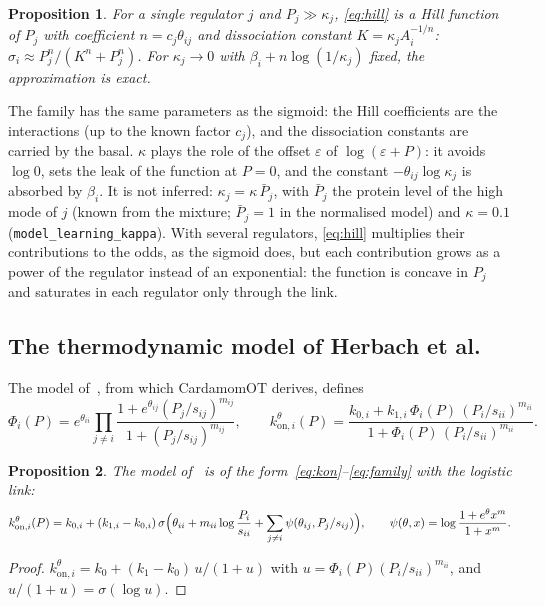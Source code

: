 \documentclass[a4paper, 11pt]{article}
\newcommand{\koni}{k_{\mathrm{on},i}^{\theta}}
\theoremstyle{plain}
\newtheorem{prop}{Proposition}
\theoremstyle{remark}
\begin{document}
\begin{prop}\label{prop:hill}
For a single regulator $j$ and $P_j \gg \kappa_j$, \eqref{eq:hill} is a Hill function of $P_j$ with coefficient $n = c_j\theta_{ij}$ and dissociation constant $K = \kappa_j A_i^{-1/n}$: $\sigma_i \approx P_j^n / (K^n + P_j^n)$. For $\kappa_j \to 0$ with $\beta_i + n\log(1/\kappa_j)$ fixed, the approximation is exact.
\end{prop}

The family has the same parameters as the sigmoid: the Hill coefficients are the interactions (up to the known factor $c_j$), and the dissociation constants are carried by the basal. $\kappa$ plays the role of the offset $\varepsilon$ of $\log(\varepsilon + P)$: it avoids $\log 0$, sets the leak of the function at $P = 0$, and the constant $-\theta_{ij}\log\kappa_j$ is absorbed by $\beta_i$. It is not inferred: $\kappa_j = \kappa\,\bar P_j$, with $\bar P_j$ the protein level of the high mode of $j$ (known from the mixture; $\bar P_j = 1$ in the normalised model) and $\kappa = 0.1$ (\texttt{model\_learning\_kappa}). With several regulators, \eqref{eq:hill} multiplies their contributions to the odds, as the sigmoid does, but each contribution grows as a power of the regulator instead of an exponential: the function is concave in $P_j$ and saturates in each regulator only through the link.

\subsection{The thermodynamic model of Herbach et al.}\label{sec:herbach}

The model of~\cite{herbachinferring2017}, from which CardamomOT derives, defines
\[
\Phi_i(P) = e^{\theta_{ii}}\prod_{j \neq i}\frac{1 + e^{\theta_{ij}}(P_j/s_{ij})^{m_{ij}}}{1 + (P_j/s_{ij})^{m_{ij}}}, \qquad
\koni(P) = \frac{k_{0,i} + k_{1,i}\,\Phi_i(P)\,(P_i/s_{ii})^{m_{ii}}}{1 + \Phi_i(P)\,(P_i/s_{ii})^{m_{ii}}}.
\]

\begin{prop}\label{prop:herbach}
The model of~\cite{herbachinferring2017} is of the form~\eqref{eq:kon}--\eqref{eq:family} with the logistic link:
\[
\koni(P) = k_{0,i} + (k_{1,i} - k_{0,i})\,\sigma\Bigl(\theta_{ii} + m_{ii}\log\frac{P_i}{s_{ii}} + \sum_{j\neq i}\psi(\theta_{ij}, P_j/s_{ij})\Bigr),
\qquad \psi(\theta, x) = \log\frac{1 + e^{\theta}x^m}{1 + x^m}.
\]
\end{prop}

\begin{proof}
$\koni = k_0 + (k_1 - k_0)\,u/(1 + u)$ with $u = \Phi_i(P)(P_i/s_{ii})^{m_{ii}}$, and $u/(1 + u) = \sigma(\log u)$.
\end{proof}
\end{document}
